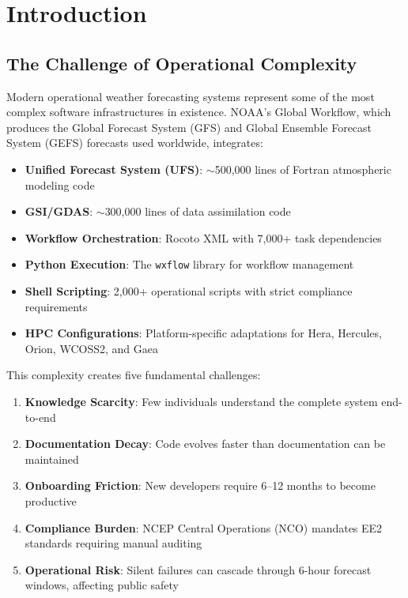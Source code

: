 \documentclass[11pt,letterpaper]{article}
\begin{document}
\section{Introduction}

\subsection{The Challenge of Operational Complexity}

Modern operational weather forecasting systems represent some of the most complex software infrastructures in existence. NOAA's Global Workflow, which produces the Global Forecast System (GFS) and Global Ensemble Forecast System (GEFS) forecasts used worldwide, integrates:

\begin{itemize}[leftmargin=*]
    \item \textbf{Unified Forecast System (UFS)}: $\sim$500,000 lines of Fortran atmospheric modeling code
    \item \textbf{GSI/GDAS}: $\sim$300,000 lines of data assimilation code
    \item \textbf{Workflow Orchestration}: Rocoto XML with 7,000+ task dependencies
    \item \textbf{Python Execution}: The \texttt{wxflow} library for workflow management
    \item \textbf{Shell Scripting}: 2,000+ operational scripts with strict compliance requirements
    \item \textbf{HPC Configurations}: Platform-specific adaptations for Hera, Hercules, Orion, WCOSS2, and Gaea
\end{itemize}

This complexity creates five fundamental challenges:

\begin{enumerate}
    \item \textbf{Knowledge Scarcity}: Few individuals understand the complete system end-to-end
    \item \textbf{Documentation Decay}: Code evolves faster than documentation can be maintained
    \item \textbf{Onboarding Friction}: New developers require 6--12 months to become productive
    \item \textbf{Compliance Burden}: NCEP Central Operations (NCO) mandates EE2 standards requiring manual auditing
    \item \textbf{Operational Risk}: Silent failures can cascade through 6-hour forecast windows, affecting public safety
\end{enumerate}
\end{document}
